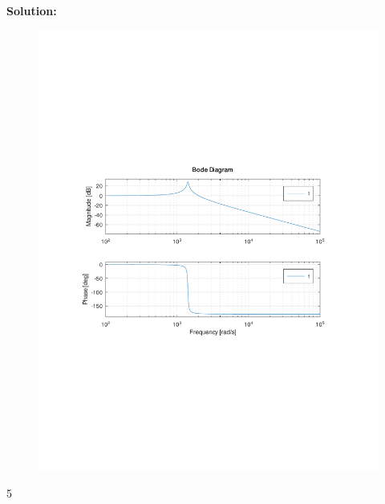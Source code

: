 \begin{enumerate}
            \textbf{Solution:}\\
            \begin{figure}[H]
                \centering
                \includegraphics[width=0.8\linewidth,trim={0 7.5cm 0 7.5cm},clip]{figures/bodeplot.pdf}
            \end{figure}
    \end{enumerate}5